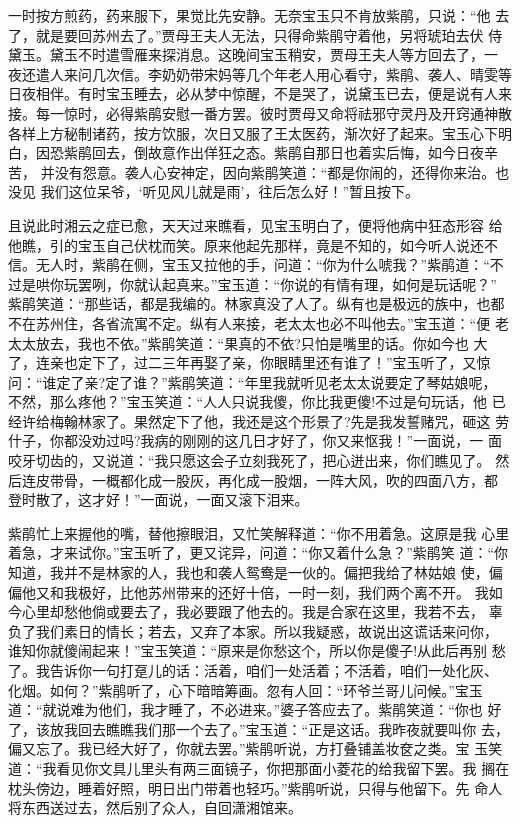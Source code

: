一时按方煎药，药来服下，果觉比先安静。无奈宝玉只不肯放紫鹃，只说：“他
去了，就是要回苏州去了。”贾母王夫人无法，只得命紫鹃守着他，另将琥珀去伏
侍黛玉。黛玉不时遣雪雁来探消息。这晚间宝玉稍安，贾母王夫人等方回去了，一
夜还遣人来问几次信。李奶奶带宋妈等几个年老人用心看守，紫鹃、袭人、晴雯等
日夜相伴。有时宝玉睡去，必从梦中惊醒，不是哭了，说黛玉已去，便是说有人来
接。每一惊时，必得紫鹃安慰一番方罢。彼时贾母又命将祛邪守灵丹及开窍通神散
各样上方秘制诸药，按方饮服，次日又服了王太医药，渐次好了起来。宝玉心下明
白，因恐紫鹃回去，倒故意作出佯狂之态。紫鹃自那日也着实后悔，如今日夜辛苦，
并没有怨意。袭人心安神定，因向紫鹃笑道：“都是你闹的，还得你来治。也没见
我们这位呆爷，‘听见风儿就是雨’，往后怎么好！”暂且按下。

且说此时湘云之症已愈，天天过来瞧看，见宝玉明白了，便将他病中狂态形容
给他瞧，引的宝玉自己伏枕而笑。原来他起先那样，竟是不知的，如今听人说还不
信。无人时，紫鹃在侧，宝玉又拉他的手，问道：“你为什么唬我？”紫鹃道：“不
过是哄你玩罢咧，你就认起真来。”宝玉道：“你说的有情有理，如何是玩话呢？”
紫鹃笑道：“那些话，都是我编的。林家真没了人了。纵有也是极远的族中，也都
不在苏州住，各省流寓不定。纵有人来接，老太太也必不叫他去。”宝玉道：“便
老太太放去，我也不依。”紫鹃笑道：“果真的不依?只怕是嘴里的话。你如今也
大了，连亲也定下了，过二三年再娶了亲，你眼睛里还有谁了！”宝玉听了，又惊
问：“谁定了亲?定了谁？”紫鹃笑道：“年里我就听见老太太说要定了琴姑娘呢，
不然，那么疼他？”宝玉笑道：“人人只说我傻，你比我更傻!不过是句玩话，他
已经许给梅翰林家了。果然定下了他，我还是这个形景了?先是我发誓赌咒，砸这
劳什子，你都没劝过吗?我病的刚刚的这几日才好了，你又来怄我！”一面说，一
面咬牙切齿的，又说道：“我只愿这会子立刻我死了，把心迸出来，你们瞧见了。
然后连皮带骨，一概都化成一股灰，再化成一股烟，一阵大风，吹的四面八方，都
登时散了，这才好！”一面说，一面又滚下泪来。

紫鹃忙上来握他的嘴，替他擦眼泪，又忙笑解释道：“你不用着急。这原是我
心里着急，才来试你。”宝玉听了，更又诧异，问道：“你又着什么急？”紫鹃笑
道：“你知道，我并不是林家的人，我也和袭人鸳鸯是一伙的。偏把我给了林姑娘
使，偏偏他又和我极好，比他苏州带来的还好十倍，一时一刻，我们两个离不开。
我如今心里却愁他倘或要去了，我必要跟了他去的。我是合家在这里，我若不去，
辜负了我们素日的情长；若去，又弃了本家。所以我疑惑，故说出这谎话来问你，
谁知你就傻闹起来！”宝玉笑道：“原来是你愁这个，所以你是傻子!从此后再别
愁了。我告诉你一句打趸儿的话：活着，咱们一处活着；不活着，咱们一处化灰、
化烟。如何？”紫鹃听了，心下暗暗筹画。忽有人回：“环爷兰哥儿问候。”宝玉
道：“就说难为他们，我才睡了，不必进来。”婆子答应去了。紫鹃笑道：“你也
好了，该放我回去瞧瞧我们那一个去了。”宝玉道：“正是这话。我昨夜就要叫你
去，偏又忘了。我已经大好了，你就去罢。”紫鹃听说，方打叠铺盖妆奁之类。宝
玉笑道：“我看见你文具儿里头有两三面镜子，你把那面小菱花的给我留下罢。我
搁在枕头傍边，睡着好照，明日出门带着也轻巧。”紫鹃听说，只得与他留下。先
命人将东西送过去，然后别了众人，自回潇湘馆来。

